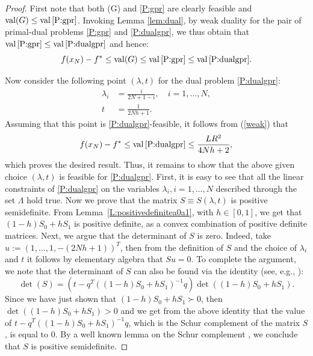 \documentclass[12pt]{article}
\numberwithin{equation}{section}
\theoremstyle{definition}
\theoremstyle{remark}
\DeclareMathOperator{\val}{val}
\begin{document}
\begin{proof} First note that both (G) and \eqref{P:gpr} are clearly feasible %
and $\val (G) \leq\val\eqref{P:gpr}$.
Invoking Lemma \ref{lem:dual}, by weak duality for the pair of primal-dual problems
\eqref{P:gpr} and \eqref{P:dualgpr}, we thus obtain that $\val\eqref{P:gpr}\leq \val\eqref{P:dualgpr}$
and hence:
\begin{equation}\label{weak}
    f(x_N)-f^* \leq \val (G) \leq \val \eqref{P:gpr} \leq \val \eqref{P:dualgpr}.
\end{equation}

Now consider the following point $(\lambda,t)$ for the dual problem \eqref{P:dualgpr}:
\begin{align*}
    \lambda_i &= \frac{i}{2 N+1-i},\quad i=1,\dots,N,  \\
    t   &= \frac{1}{2Nh+1}.
\end{align*}
Assuming that this point is \eqref{P:dualgpr}-feasible, it follows from (\ref{weak}) that
$$
f(x_N)-f^* \leq \val\eqref{P:dualgpr} \leq \frac{L R^2}{4 N h+2},
$$
which proves the desired result. Thus, it remains to show that the above given choice
$(\lambda, t)$ is feasible for \eqref{P:dualgpr}. First, it is easy to see that all the linear constraints
of \eqref{P:dualgpr} on the variables $\lambda_i, i=1,\ldots ,N$ described through the set $\Lambda$
hold true. Now we prove that the matrix $S\equiv S(\lambda,t)$ is positive semidefinite. From
Lemma~\ref{L:positivedefinitea0a1}, with $h \in [0,1]$, we get that $(1-h)S_0 + h S_1$ is
positive definite, as a convex combination of positive definite matrices. Next, we argue that
the determinant of $S$ is zero. Indeed, take $u:=(1,\dots,1,-(2Nh+1))^T$, then from the
definition of $S$ and the choice of $\lambda_i$ and $t$ it follows by elementary algebra that
$Su=0$. To complete the argument, we note that the determinant of $S$ can also be found via
the identity (see, e.g., \cite[Section~A.5.5]{boyd2004}):
\[
    \det(S) = (t-q^T((1-h)S_0 + h S_1)^{-1}q) \det((1-h)S_0 + h S_1).
\]
Since we have just shown that  $(1-h)S_0 + h S_1 \succ 0$, then $\det((1-h)S_0 + h S_1)>0$ and
we get from the above identity that the value of $t-q^T((1-h)S_0 + h S_1)^{-1}q$, which is the
Schur complement of the matrix $S$, is equal to 0. By a well known lemma on the Schur
complement \cite[Lemma~4.2.1]{ben2001lectures}, we conclude that $S$ is positive semidefinite.
\end{proof}
\end{document}
